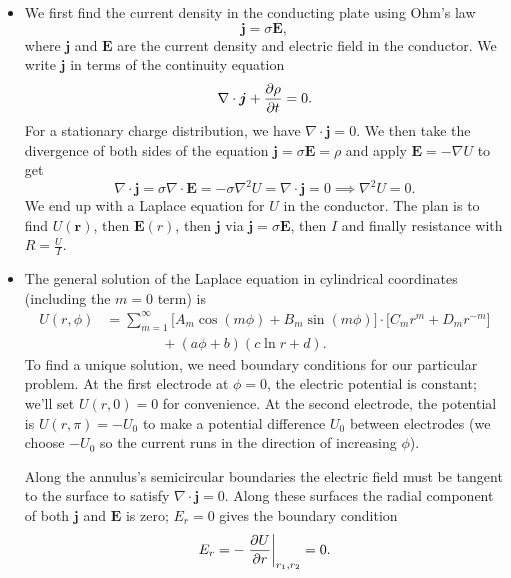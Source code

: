 \documentclass[11pt, a4paper]{article}
\renewcommand{\vec}[1]{\bm{#1}} %
\renewcommand{\r}{\vec{r}}
\newcommand{\E}{\vec{E}}  %
\renewcommand{\div}{\nabla \cdot}
\renewcommand{\grad}{\nabla}
\renewcommand{\laplacian}{\nabla^{2}}
\begin{document}
\begin{itemize}
	\item We first find the current density in the conducting plate using Ohm's law
	\begin{equation*}
		\vec{j} = \sigma \E,
	\end{equation*}
	where $ \vec{j} $ and $ \E $ are the current density and electric field in the conductor. We write $ \vec{j} $ in terms of the continuity equation
	\begin{equation*}
		\div \vec{j} + \pdv{\rho}{t} = 0.
	\end{equation*}
	For a stationary charge distribution, we have $ \div \vec{j} = 0 $. We then take the divergence of both sides of the equation $ \vec{j} = \sigma \E = \rho  $ and apply $ \E = - \grad U $ to get
	\begin{equation*}
		\div \vec{j} = \sigma \div \E = - \sigma \laplacian U = \div \vec{j} = 0 \implies \laplacian U = 0.
	\end{equation*}
	We end up with a Laplace equation for $ U $ in the conductor. The plan is to find $ U(\r) $, then $ \E(r) $, then $ \vec{j} $ via $ \vec{j} = \sigma \E $, then $ I $ and finally resistance with $ R = \frac{U}{I} $. 
	
	\item The general solution of the Laplace equation in cylindrical coordinates (including the $ m = 0 $ term) is
	\begin{align*}
		U(r, \phi) &= \sum_{m=1}^{\infty} \big[A_{m}\cos(m\phi) + B_{m}\sin(m \phi)\big] \cdot \big[C_{m}r^{m} + D_{m}r^{-m}\big]\\
		& \qquad \qquad  + (a \phi + b)(c \ln r + d).
	\end{align*}
	To find a unique solution, we need boundary conditions for our particular problem. At the first electrode at $ \phi = 0 $, the electric potential is constant; we'll set $ U(r, 0) = 0 $  for convenience. At the second electrode, the potential is $ U(r, \pi)  = -U_{0}$ to make a potential difference $ U_{0} $ between electrodes (we choose $ -U_{0} $ so the current runs in the direction of increasing $ \phi $). 
	
	Along the annulus's semicircular boundaries the electric field must be tangent to the surface to satisfy $ \div \vec{j} = 0 $. Along these surfaces the radial component of both $ \vec{j} $ and $ \E $ is zero; $ E_{r} = 0 $ gives the boundary condition
	\begin{equation*}
		E_{r} = - \eval{\pdv{U}{r}}_{r_{1}, r_{2}} = 0.
	\end{equation*}
	

\end{itemize}
\end{document}
